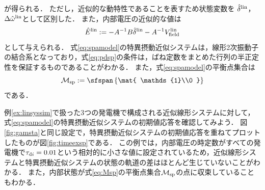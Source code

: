 \documentclass[a4j,10pt,oneside,openany,dvipdfmx]{jsbook}
\begin{document}
が得られる．
ただし，近似的な動特性であることを表すため状態変数を
$\hat{\delta}^{\rm lin}$，
$\Delta \hat{\omega}^{\rm lin}$として区別した．
また，内部電圧の近似的な値は
\[
\hat{E}^{\rm lin}:=  -A^{-1} B \hat{\delta}^{\rm lin}
- A^{-1} V^{\rm lin}_{\rm field}
\]
として与えられる．
式\eqref{eq:spamodel}の特異摂動近似システムは，線形2次振動子の結合系となっており，式\eqref{eq:pdsp}の条件は，ばね定数をまとめた行列の半正定性を保証するものであることがわかる．
また，式\eqref{eq:spamodel}の平衡点集合は
\begin{equation}\label{eq:Msp}
\mathcal{M}_{\rm sp} := \sfspan 
\left\{
\mat{ \mathds{1}\\0 }
\right\}
\end{equation}
である．

\begin{example}[特異摂動近似システムの初期値応答]
例\ref{ex:linsyssim}で扱った3つの発電機で構成される近似線形システムに対して，式\eqref{eq:spamodel}の特異摂動近似システムの初期値応答を確認してみよう．
図\ref{fig:gamsta}と同じ設定で，特異摂動近似システムの初期値応答を重ねてプロットしたものが図\ref{fig:timeexsp}である．
この例では，内部電圧の時定数がすべての発電機で$\tau_{{\rm d}i}=0.01$という相対的に小さな値に設定されているため，近似線形システムと特異摂動近似システムの状態の軌道の差はほとんど生じていないことがわかる．
また，内部状態が式\eqref{eq:Msp}の平衡点集合$\mathcal{M}_{\rm sp}$の点に収束していることもわかる．
\end{example}
\end{document}
